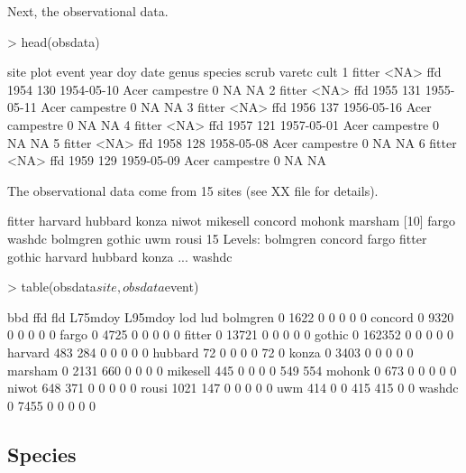\documentclass{article}
\begin{document}
Next, the observational data. 

\begin{Schunk}
\begin{Sinput}
> head(obsdata)
\end{Sinput}
\begin{Soutput}
    site plot event year doy       date genus   species scrub varetc cult
1 fitter <NA>   ffd 1954 130 1954-05-10  Acer campestre     0     NA   NA
2 fitter <NA>   ffd 1955 131 1955-05-11  Acer campestre     0     NA   NA
3 fitter <NA>   ffd 1956 137 1956-05-16  Acer campestre     0     NA   NA
4 fitter <NA>   ffd 1957 121 1957-05-01  Acer campestre     0     NA   NA
5 fitter <NA>   ffd 1958 128 1958-05-08  Acer campestre     0     NA   NA
6 fitter <NA>   ffd 1959 129 1959-05-09  Acer campestre     0     NA   NA
\end{Soutput}
\end{Schunk}

The observational data come from 15 sites (see XX file for details).

\begin{Schunk}
\begin{Soutput}
 [1] fitter   harvard  hubbard  konza    niwot    mikesell concord  mohonk   marsham 
[10] fargo    washdc   bolmgren gothic   uwm      rousi   
15 Levels: bolmgren concord fargo fitter gothic harvard hubbard konza ... washdc
\end{Soutput}
\end{Schunk}

\begin{Schunk}
\begin{Sinput}
> table(obsdata$site, obsdata$event)
\end{Sinput}
\begin{Soutput}
              bbd    ffd    fld L75mdoy L95mdoy    lod    lud
  bolmgren      0   1622      0       0       0      0      0
  concord       0   9320      0       0       0      0      0
  fargo         0   4725      0       0       0      0      0
  fitter        0  13721      0       0       0      0      0
  gothic        0 162352      0       0       0      0      0
  harvard     483    284      0       0       0      0      0
  hubbard      72      0      0       0       0     72      0
  konza         0   3403      0       0       0      0      0
  marsham       0   2131    660       0       0      0      0
  mikesell    445      0      0       0       0    549    554
  mohonk        0    673      0       0       0      0      0
  niwot       648    371      0       0       0      0      0
  rousi      1021    147      0       0       0      0      0
  uwm         414      0      0     415     415      0      0
  washdc        0   7455      0       0       0      0      0
\end{Soutput}
\end{Schunk}

\subsection{Species}
\end{document}
